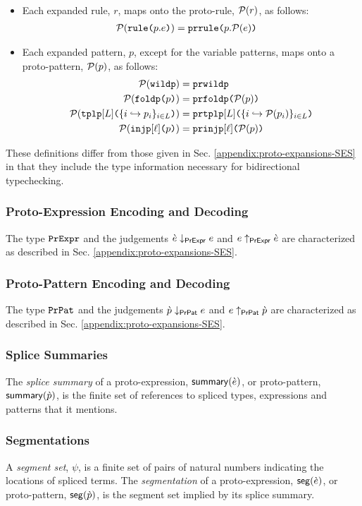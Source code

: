 \begin{itemize}
\[\begin{array}{rl}
  \end{array}\]
  \item Each expanded rule, $r$, maps onto the proto-rule, $\mathcal{P}(r)$, as follows:
  \begin{align*}
  \mathcal{P}(\texttt{rule}\texttt{(}p.e\texttt{)}) & = \texttt{prrule}\texttt{(}p.\mathcal{P}(e)\texttt{)}
  \end{align*}
  \item Each expanded pattern, $p$, except for the variable patterns, maps onto a proto-pattern, $\mathcal{P}(p)$, as follows:
  \begin{align*}
  \mathcal{P}(\texttt{wildp}) & = \texttt{prwildp}\\
  \mathcal{P}(\texttt{foldp}\texttt{(}p\texttt{)}) & = \texttt{prfoldp}\texttt{(}\mathcal{P}(p)\texttt{)}\\
  \mathcal{P}(\texttt{tplp}[L]\texttt{(}\{i \hookrightarrow p_{i}\}_{i \in L}\texttt{)}) & = \texttt{prtplp}[L]\texttt{(}\{i \hookrightarrow \mathcal{P}(p_{i})\}_{i \in L}\texttt{)}\\
  \mathcal{P}(\texttt{injp}[\ell]\texttt{(}p\texttt{)}) & = \texttt{prinjp}[\ell]\texttt{(}\mathcal{P}(p)\texttt{)}
  \end{align*}
\end{itemize}

These definitions differ from those given in Sec. \ref{appendix:proto-expansions-SES} in that they include the type information necessary for bidirectional typechecking.

\subsubsection{Proto-Expression Encoding and Decoding}
The type $\mathtt{PrExpr}$ and the judgements $\grave{e} \downarrow_\mathsf{PrExpr} e$ and $e \uparrow_\mathsf{PrExpr} \grave{e}$ are characterized as described in Sec. \ref{appendix:proto-expansions-SES}.

\subsubsection{Proto-Pattern Encoding and Decoding}
The type $\mathtt{PrPat}$ and the judgements $\grave{p} \downarrow_\mathsf{PrPat} e$ and $e \uparrow_\mathsf{PrPat} \grave{p}$ are characterized as described in Sec. \ref{appendix:proto-expansions-SES}.

\subsubsection{Splice Summaries}
The \emph{splice summary} of a proto-expression, $\mathsf{summary}(\grave{e})$, or proto-pattern, $\mathsf{summary}(\grave{p})$, is the finite set of references to spliced types, expressions {and patterns} that it mentions.

\subsubsection{Segmentations}
A \emph{segment set}, $\psi$, is a finite set of pairs of natural numbers indicating the locations of spliced terms. The \emph{segmentation} of a proto-expression, $\mathsf{seg}(\grave{e})$, or proto-pattern, $\mathsf{seg}(\grave{p})$, is the segment set implied by its splice summary.

